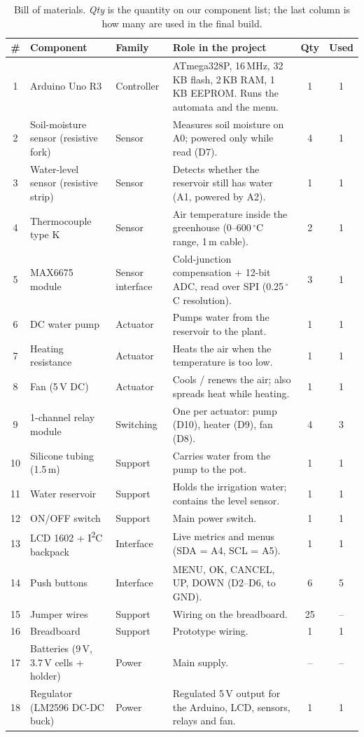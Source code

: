 \documentclass[10pt,a4paper,twocolumn]{article}
\begin{document}
\begin{table}[t]
\centering\small
\caption{Bill of materials. \emph{Qty} is the quantity on our component list; the
last column is how many are used in the final build.}
\label{tab:components}
\begin{tabularx}{\textwidth}{@{}c l l X c c@{}}
\toprule
\# & Component & Family & Role in the project & Qty & Used\\
\midrule
1  & Arduino Uno R3 & Controller & ATmega328P, 16\,MHz, 32\,KB flash, 2\,KB RAM, 1\,KB EEPROM. Runs the automata and the menu. & 1 & 1\\
2  & Soil-moisture sensor (resistive fork) & Sensor & Measures soil moisture on A0; powered only while read (D7). & 4 & 1\\
3  & Water-level sensor (resistive strip) & Sensor & Detects whether the reservoir still has water (A1, powered by A2). & 1 & 1\\
4  & Thermocouple type K & Sensor & Air temperature inside the greenhouse (0--600\,$^\circ$C range, 1\,m cable). & 2 & 1\\
5  & MAX6675 module & Sensor interface & Cold-junction compensation + 12-bit ADC, read over SPI (0.25\,$^\circ$C resolution). & 3 & 1\\
6  & DC water pump & Actuator & Pumps water from the reservoir to the plant. & 1 & 1\\
7  & Heating resistance & Actuator & Heats the air when the temperature is too low. & 1 & 1\\
8  & Fan (5\,V DC) & Actuator & Cools / renews the air; also spreads heat while heating. & 1 & 1\\
9  & 1-channel relay module & Switching & One per actuator: pump (D10), heater (D9), fan (D8). & 4 & 3\\
10 & Silicone tubing (1.5\,m) & Support & Carries water from the pump to the pot. & 1 & 1\\
11 & Water reservoir & Support & Holds the irrigation water; contains the level sensor. & 1 & 1\\
12 & ON/OFF switch & Support & Main power switch. & 1 & 1\\
13 & LCD 1602 + I\textsuperscript{2}C backpack & Interface & Live metrics and menus (SDA = A4, SCL = A5). & 1 & 1\\
14 & Push buttons & Interface & MENU, OK, CANCEL, UP, DOWN (D2--D6, to GND). & 6 & 5\\
15 & Jumper wires & Support & Wiring on the breadboard. & 25 & --\\
16 & Breadboard & Support & Prototype wiring. & 1 & 1\\
17 & Batteries (9\,V, 3.7\,V cells + holder) & Power & Main supply. & -- & --\\
18 & Regulator (LM2596 DC-DC buck) & Power & Regulated 5\,V output for the Arduino, LCD, sensors, relays and fan. & 1 & 1\\
\bottomrule
\end{tabularx}
\end{table}
\end{document}
